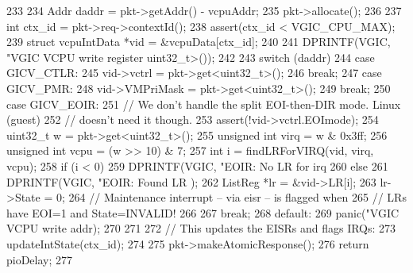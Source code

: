 \begin{DoxyCode}
233 {
234     Addr daddr = pkt->getAddr() - vcpuAddr;
235     pkt->allocate();
236 
237     int ctx_id = pkt->req->contextId();
238     assert(ctx_id < VGIC_CPU_MAX);
239     struct vcpuIntData *vid = &vcpuData[ctx_id];
240 
241     DPRINTF(VGIC, "VGIC VCPU write register %
      uint32_t>());
242 
243     switch (daddr) {
244       case GICV_CTLR:
245         vid->vctrl = pkt->get<uint32_t>();
246         break;
247       case GICV_PMR:
248         vid->VMPriMask = pkt->get<uint32_t>();
249         break;
250       case GICV_EOIR: {
251           // We don't handle the split EOI-then-DIR mode.  Linux (guest)
252           // doesn't need it though.
253           assert(!vid->vctrl.EOImode);
254           uint32_t w = pkt->get<uint32_t>();
255           unsigned int virq = w & 0x3ff;
256           unsigned int vcpu = (w >> 10) & 7;
257           int i = findLRForVIRQ(vid, virq, vcpu);
258           if (i < 0) {
259               DPRINTF(VGIC, "EOIR: No LR for irq %
260           } else {
261               DPRINTF(VGIC, "EOIR: Found LR%
      );
262               ListReg *lr = &vid->LR[i];
263               lr->State = 0;
264               // Maintenance interrupt -- via eisr -- is flagged when
265               // LRs have EOI=1 and State=INVALID!
266           }
267       } break;
268       default:
269         panic("VGIC VCPU write %
      addr);
270     }
271 
272     // This updates the EISRs and flags IRQs:
273     updateIntState(ctx_id);
274 
275     pkt->makeAtomicResponse();
276     return pioDelay;
277 }
\end{DoxyCode}


